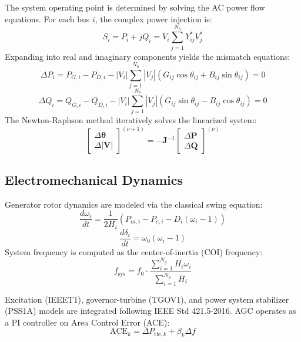 \documentclass[conference]{IEEEtran}
\begin{document}
The system operating point is determined by solving the AC power flow equations. For each bus $i$, the complex power injection is:
\begin{equation}
S_i = P_i + jQ_i = V_i \sum_{j=1}^{N_b} Y_{ij}^* V_j^*
\end{equation}
Expanding into real and imaginary components yields the mismatch equations:
\begin{equation}
\Delta P_i = P_{G,i} - P_{D,i} - |V_i| \sum_{j=1}^{N_b} |V_j| \left( G_{ij} \cos\theta_{ij} + B_{ij} \sin\theta_{ij} \right) = 0
\end{equation}
\begin{equation}
\Delta Q_i = Q_{G,i} - Q_{D,i} - |V_i| \sum_{j=1}^{N_b} |V_j| \left( G_{ij} \sin\theta_{ij} - B_{ij} \cos\theta_{ij} \right) = 0
\end{equation}
The Newton-Raphson method iteratively solves the linearized system:
\begin{equation}
\begin{bmatrix} \Delta \boldsymbol{\theta} \\ \Delta |\mathbf{V}| \end{bmatrix}^{(\nu+1)} = -\mathbf{J}^{-1} \begin{bmatrix} \Delta \mathbf{P} \\ \Delta \mathbf{Q} \end{bmatrix}^{(\nu)}
\end{equation}

\subsection{Electromechanical Dynamics}

Generator rotor dynamics are modeled via the classical swing equation:
\begin{equation}
\frac{d\omega_i}{dt} = \frac{1}{2H_i} \left( P_{m,i} - P_{e,i} - D_i (\omega_i - 1) \right)
\end{equation}
\begin{equation}
\frac{d\delta_i}{dt} = \omega_0 (\omega_i - 1)
\end{equation}
System frequency is computed as the center-of-inertia (COI) frequency:
\begin{equation}
f_{\text{sys}} = f_0 \cdot \frac{\sum_{i=1}^{N_g} H_i \omega_i}{\sum_{i=1}^{N_g} H_i}
\end{equation}

Excitation (IEEET1), governor-turbine (TGOV1), and power system stabilizer (PSS1A) models are integrated following IEEE Std 421.5-2016. AGC operates as a PI controller on Area Control Error (ACE):
\begin{equation}
\text{ACE}_k = \Delta P_{\text{tie},k} + \beta_k \Delta f
\end{equation}
\end{document}
